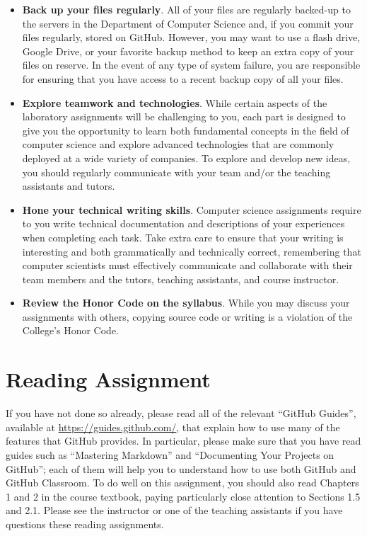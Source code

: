 \documentclass[11pt]{article}
\begin{document}
\begin{itemize}
\item {\bf Back up your files regularly}. All of your files are regularly backed-up to the servers in the Department of
  Computer Science and, if you commit your files regularly, stored on GitHub. However, you may want to use a flash
  drive, Google Drive, or your favorite backup method to keep an extra copy of your files on reserve. In the event of
  any type of system failure, you are responsible for ensuring that you have access to a recent backup copy of all your
  files.

\item {\bf Explore teamwork and technologies}. While certain aspects of the laboratory assignments will be challenging
  to you, each part is designed to give you the opportunity to learn both fundamental concepts in the field of computer
  science and explore advanced technologies that are commonly deployed at a wide variety of companies. To explore and
  develop new ideas, you should regularly communicate with your team and/or the teaching assistants and tutors.

\item {\bf Hone your technical writing skills}. Computer science assignments require to you write technical
  documentation and descriptions of your experiences when completing each task. Take extra care to ensure that your
  writing is interesting and both grammatically and technically correct, remembering that computer scientists must
  effectively communicate and collaborate with their team members and the tutors, teaching assistants, and course
  instructor.

\item {\bf Review the Honor Code on the syllabus}. While you may discuss your assignments with others, copying source
  code or writing is a violation of the College's Honor Code.

\end{itemize}

\section*{Reading Assignment}

If you have not done so already, please read all of the relevant ``GitHub Guides'', available at
\url{https://guides.github.com/}, that explain how to use many of the features that GitHub provides. In particular,
please make sure that you have read guides such as ``Mastering Markdown'' and ``Documenting Your Projects on GitHub'';
each of them will help you to understand how to use both GitHub and GitHub Classroom. To do well on this assignment, you
should also read Chapters 1 and 2 in the course textbook, paying particularly close attention to Sections 1.5 and 2.1.
Please see the instructor or one of the teaching assistants if you have questions these reading assignments.
\end{document}
